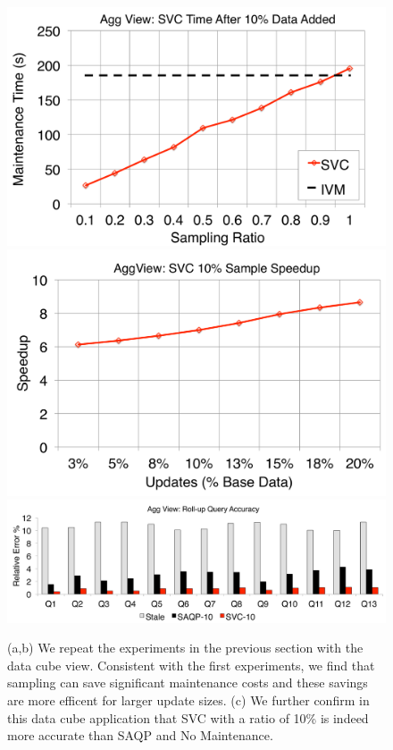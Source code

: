 \begin{figure}[t]
\centering
 \includegraphics[scale=0.20]{exp/msdc_1.pdf}
 \includegraphics[scale=0.20]{exp/msdc_2.pdf}
  \includegraphics[scale=0.17]{exp/msdc_3.pdf}
   \caption{(a,b) We repeat the experiments in the previous section with the data cube view. Consistent with the first experiments, we find that sampling can save significant maintenance costs and these savings are more efficent for larger update sizes. (c) We further confirm in this data cube application that SVC with a ratio of 10\% is indeed more accurate than SAQP and No Maintenance.\label{exp2-acc-sample}}
\end{figure}

